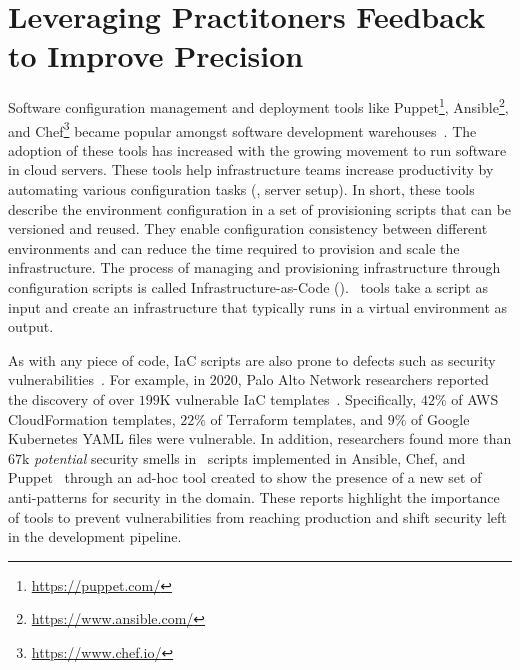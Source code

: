 \section{Leveraging Practitoners Feedback to Improve Precision}
\label{sec:intro}

Software configuration management and deployment tools like
Puppet\footnote{\url{https://puppet.com/}}, 
Ansible\footnote{\url{https://www.ansible.com/}},
and Chef\footnote{\url{https://www.chef.io/}} became 
popular amongst software development warehouses~\cite{8919181,rahman2017factors}. 
The adoption of these tools has increased with the growing 
movement to run software in cloud servers. These tools help 
infrastructure teams increase productivity by automating various 
configuration tasks (\myeg{}, server setup). 
In short, these tools describe the environment configuration in 
a set of provisioning scripts that can be versioned and 
reused. They enable configuration consistency between different 
environments and can reduce the time required to provision and 
scale the infrastructure.
The process of managing and provisioning infrastructure through 
configuration scripts is called Infrastructure-as-Code (\iac). 
\iac\ tools take a script as input and create an infrastructure 
that typically runs in a virtual environment as output.

%
As with any piece of code, IaC scripts are also prone to defects 
such as security vulnerabilities~\cite{8812041}. For example, 
in $2020$, Palo Alto Network researchers reported the discovery 
of over $199$K vulnerable IaC templates~\cite{paloalto-unit42}. 
Specifically, $42\%$ of AWS CloudFormation templates, $22\%$ of 
Terraform templates, and $9\%$ of Google Kubernetes YAML files 
were vulnerable. In addition, researchers found more than $67$k 
\textit{potential} security smells in \iac\ scripts implemented 
in Ansible, Chef, and Puppet~\cite{9388795} through an ad-hoc 
tool created to show the presence of a new set of anti-patterns 
for security in the \iac{} domain. 
These reports highlight the importance of tools to prevent 
vulnerabilities from reaching production and shift security left 
in the development pipeline. 


